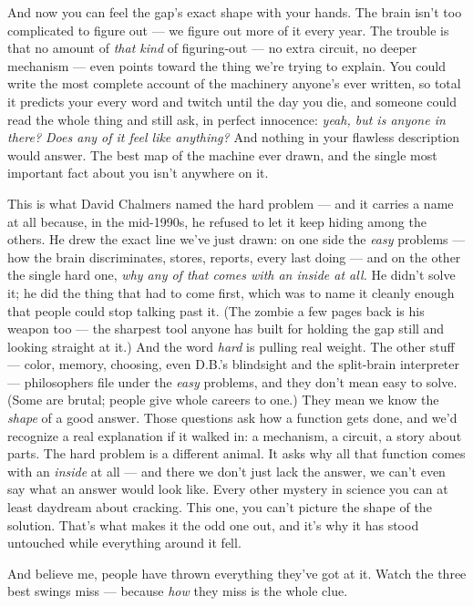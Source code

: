 \documentclass[11pt,openany]{book}
\begin{document}
And now you can feel the gap’s exact shape with your hands. The brain isn’t too complicated to figure out — we figure out more of it every year. The trouble is that no amount of \textit{that kind} of figuring-out — no extra circuit, no deeper mechanism — even points toward the thing we’re trying to explain. You could write the most complete account of the machinery anyone’s ever written, so total it predicts your every word and twitch until the day you die, and someone could read the whole thing and still ask, in perfect innocence: \textit{yeah, but is anyone in there? Does any of it feel like anything?} And nothing in your flawless description would answer. The best map of the machine ever drawn, and the single most important fact about you isn’t anywhere on it.

This is what David Chalmers named the hard problem — and it carries a name at all because, in the mid-1990s, he refused to let it keep hiding among the others. He drew the exact line we’ve just drawn: on one side the \textit{easy} problems — how the brain discriminates, stores, reports, every last doing — and on the other the single hard one, \textit{why any of that comes with an inside at all.} He didn’t solve it; he did the thing that had to come first, which was to name it cleanly enough that people could stop talking past it. (The zombie a few pages back is his weapon too — the sharpest tool anyone has built for holding the gap still and looking straight at it.) And the word \textit{hard} is pulling real weight. The other stuff — color, memory, choosing, even D.B.’s blindsight and the split-brain interpreter — philosophers file under the \textit{easy} problems, and they don’t mean easy to solve. (Some are brutal; people give whole careers to one.) They mean we know the \textit{shape} of a good answer. Those questions ask how a function gets done, and we’d recognize a real explanation if it walked in: a mechanism, a circuit, a story about parts. The hard problem is a different animal. It asks why all that function comes with an \textit{inside} at all — and there we don’t just lack the answer, we can’t even say what an answer would look like. Every other mystery in science you can at least daydream about cracking. This one, you can’t picture the shape of the solution. That’s what makes it the odd one out, and it’s why it has stood untouched while everything around it fell.

And believe me, people have thrown everything they’ve got at it. Watch the three best swings miss — because \textit{how} they miss is the whole clue.
\end{document}
